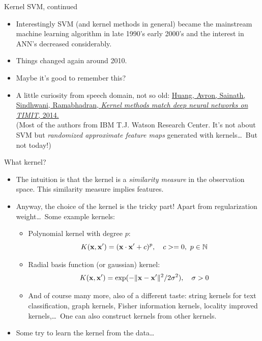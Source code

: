 \documentclass[handout]{beamer}   %
\def\N{\mathbb{N}}
\def\b#1{{\bf #1}}
\begin{document}
\begin{frame}{Kernel SVM, continued}
  \begin{itemize}[<+->]
  \item Interestingly SVM (and kernel methods in general) became the mainstream machine learning
    algorithm in late 1990's early 2000's and the interest in ANN's decreased considerably.
  \item Things changed again around 2010.
  \item Maybe it's good to remember this?
  \item A little curiosity from speech domain, not so old:
    \href{https://pdfs.semanticscholar.org/3cc7/230bd445128fc0dfb62cf54bfb01c25d377c.pdf}%
         {Huang, Avron, Sainath, Sindhwani, Ramabhadran,
           {\it Kernel methods match deep neural networks on TIMIT}, 2014.}\\
         (Most of the authors from IBM T.J. Watson Research Center. It's not about SVM but
         {\it randomized approximate feature maps\/} generated with kernels\/\ldots\ But not today!)

  \end{itemize}
\end{frame}


\begin{frame}{What kernel?}
  \begin{itemize}[<+->]
  \item The intuition is that the kernel is a {\it similarity measure\/} in the observation
    space. This similarity measure implies features.
  \item Anyway, the choice of the kernel is the tricky part! Apart from regularization weight\/\ldots\
    Some example kernels:
    \begin{itemize}[<+->]
    \item Polynomial kernel with degree $p$:
      $$ K(\b x,\b x') = (\b x\cdot\b x' + c)^p, \quad c>=0,\ p\in\N $$
    \item Radial basis function (or gaussian) kernel:
      $$ K(\b x, \b x') = \exp(-\|\b x-\b x'\|^2/2\sigma^2), \quad \sigma>0 $$
    \item And of course many more, also of a different taste: string kernels for text
      classification, graph kernels, Fisher information kernels,
      locality improved kernels,\/\dots\ One can also construct kernels from other kernels.
    \end{itemize}
  \item Some try to learn the kernel from the data\/\ldots
  \end{itemize}
\end{frame}
\end{document}

